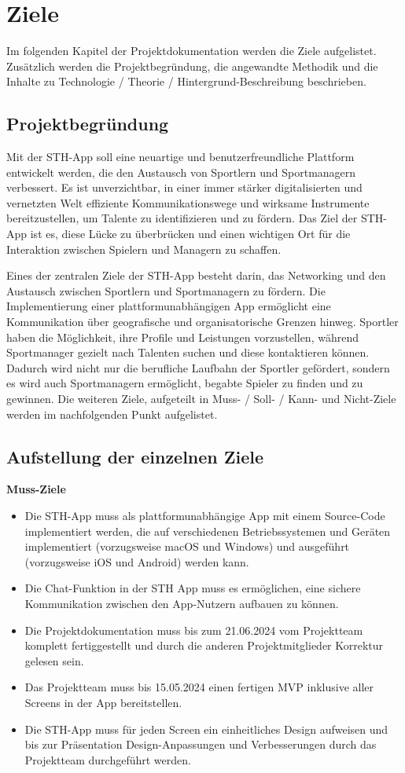 \chapter{Ziele}
Im folgenden Kapitel der Projektdokumentation werden die Ziele aufgelistet.
Zusätzlich werden die Projektbegründung, die angewandte Methodik und die Inhalte zu Technologie / Theorie / Hintergrund-Beschreibung beschrieben.
\section{Projektbegründung}
Mit der STH-App soll eine neuartige und benutzerfreundliche Plattform entwickelt werden, die den Austausch von Sportlern und Sportmanagern verbessert.
Es ist unverzichtbar, in einer immer stärker digitalisierten und vernetzten Welt effiziente Kommunikationswege und wirksame Instrumente bereitzustellen, um Talente zu identifizieren und zu fördern.
Das Ziel der STH-App ist es, diese Lücke zu überbrücken und einen wichtigen Ort für die Interaktion zwischen Spielern und Managern zu schaffen.

\noindent
Eines der zentralen Ziele der STH-App besteht darin, das Networking und den Austausch zwischen Sportlern und Sportmanagern zu fördern.
Die Implementierung einer plattformunabhängigen App ermöglicht eine Kommunikation über geografische und organisatorische Grenzen hinweg.
Sportler haben die Möglichkeit, ihre Profile und Leistungen vorzustellen, während Sportmanager gezielt nach Talenten suchen und diese kontaktieren können.
Dadurch wird nicht nur die berufliche Laufbahn der Sportler gefördert, sondern es wird auch Sportmanagern ermöglicht, begabte Spieler zu finden und zu gewinnen.
\newline
Die weiteren Ziele, aufgeteilt in Muss- / Soll- / Kann- und Nicht-Ziele werden im nachfolgenden Punkt aufgelistet.

\section{Aufstellung der einzelnen Ziele}
\textbf{Muss-Ziele}
\begin{itemize}
    \item Die STH-App muss als plattformunabhängige App mit einem Source-Code implementiert werden, die auf verschiedenen Betriebssystemen und Geräten implementiert (vorzugsweise macOS und Windows) und ausgeführt (vorzugsweise iOS und Android) werden kann.
    \item Die Chat-Funktion in der STH App muss es ermöglichen, eine sichere Kommunikation zwischen den App-Nutzern aufbauen zu können.
    \item Die Projektdokumentation muss bis zum 21.06.2024 vom Projektteam komplett fertiggestellt und durch die anderen Projektmitglieder Korrektur gelesen sein.
    \item Das Projektteam muss bis 15.05.2024 einen fertigen MVP inklusive aller Screens in der App bereitstellen.
    \item Die STH-App muss für jeden Screen ein einheitliches Design aufweisen und bis zur Präsentation Design-Anpassungen und Verbesserungen durch das Projektteam durchgeführt werden.
\end{itemize}

